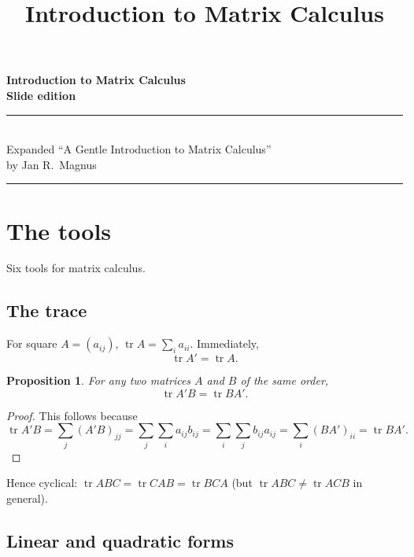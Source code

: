 \documentclass[14pt]{extarticle}
\title{\color{hdrBG}\bfseries\Huge Introduction to Matrix Calculus}
\author{}
\date{}
\theoremstyle{plain}
\newtheorem{proposition}{Proposition}
\theoremstyle{definition}
\theoremstyle{remark}
\DeclareMathOperator{\tr}{tr}
\begin{document}
\begin{titlepage}
\thispagestyle{empty}
\vspace*{\fill}
\begin{center}
{\color{hdrBG}\bfseries\fontsize{36}{44}\selectfont Introduction to Matrix Calculus}\\[1.2em]
{\color{accent}\bfseries\Large Slide edition}\\[2em]
\rule{60mm}{0.8pt}\\[1em]
{\large Expanded ``A Gentle Introduction to Matrix Calculus''\\[0.2em] by Jan R.\ Magnus}\\[2em]
\rule{60mm}{0.8pt}
\end{center}
\vspace*{\fill}
\end{titlepage}

\section{The tools}\label{sec:2}

Six tools for matrix calculus.

\subsection{The trace}\label{sec:2.1}

For square $A = (a_{ij})$, $\tr A = \sum_i a_{ii}$. Immediately,
\begin{equation}\label{eq:1}
\tr A' = \tr A.
\end{equation}

\begin{proposition}\label{prp:1}
For any two matrices $A$ and $B$ of the same order,
\[
\tr A'B = \tr BA'.
\]
\end{proposition}

\begin{proof}
This follows because
\[
\tr A'B = \sum_j (A'B)_{jj} = \sum_j \sum_i a_{ij} b_{ij}
= \sum_i \sum_j b_{ij} a_{ij} = \sum_i (BA')_{ii} = \tr BA'.
\]
\end{proof}

Hence cyclical: $\tr ABC = \tr CAB = \tr BCA$ (but $\tr ABC \neq \tr ACB$ in general).

\subsection{Linear and quadratic forms}\label{sec:2.2}
\end{document}
